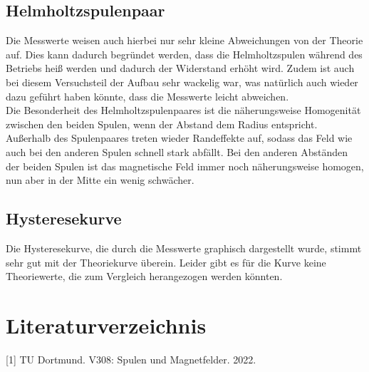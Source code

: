 \documentclass[
  bibliography=totoc,     %
  captions=tableheading,  %
  titlepage=firstiscover, %
]{scrartcl}
\begin{document}
  \subsection{Helmholtzspulenpaar}

  Die Messwerte weisen auch hierbei nur sehr kleine Abweichungen von der Theorie auf. Dies kann dadurch begründet werden,
  dass die Helmholtzspulen während des Betriebs heiß werden und dadurch der Widerstand erhöht wird. Zudem ist auch bei diesem
  Versuchsteil der Aufbau sehr wackelig war, was natürlich auch wieder dazu geführt haben könnte, dass die Messwerte leicht
  abweichen.\\
  Die Besonderheit des Helmholtzspulenpaares ist die näherungsweise Homogenität zwischen den beiden Spulen, wenn der Abstand
  dem Radius entspricht. Außerhalb des Spulenpaares treten wieder Randeffekte auf, sodass das Feld wie auch bei den anderen 
  Spulen schnell stark abfällt. Bei den anderen Abständen der beiden Spulen ist das magnetische Feld immer noch näherungsweise
  homogen, nun aber in der Mitte ein wenig schwächer.

  \subsection{Hysteresekurve}

  Die Hysteresekurve, die durch die Messwerte graphisch dargestellt wurde, stimmt sehr gut mit der Theoriekurve überein.
  Leider gibt es für die Kurve keine Theoriewerte, die zum Vergleich herangezogen werden könnten.

  \newpage
  \section{Literaturverzeichnis}
    [1] TU Dortmund. V308: Spulen und Magnetfelder. 2022.
\end{document}
